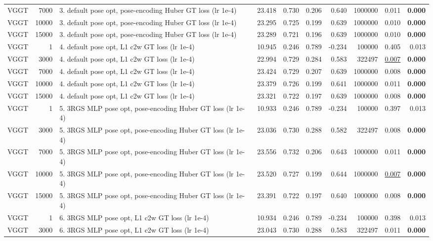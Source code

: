 \begin{table}[H]
\begin{tabular}{lrlrrrrrrr}
VGGT & 7000 & 3. default pose opt, pose-encoding Huber GT loss (lr 1e-4) & 23.418 & 0.730 & 0.206 & 0.640 & 1000000 & 0.011 & \textbf{0.000} \\
VGGT & 10000 & 3. default pose opt, pose-encoding Huber GT loss (lr 1e-4) & 23.295 & 0.725 & 0.199 & 0.639 & 1000000 & 0.010 & \textbf{0.000} \\
VGGT & 15000 & 3. default pose opt, pose-encoding Huber GT loss (lr 1e-4) & 23.289 & 0.721 & 0.196 & 0.639 & 1000000 & 0.010 & \textbf{0.000} \\
VGGT & 1 & 4. default pose opt, L1 c2w GT loss (lr 1e-4) & 10.945 & 0.246 & 0.789 & -0.234 & 100000 & 0.405 & 0.013 \\
VGGT & 3000 & 4. default pose opt, L1 c2w GT loss (lr 1e-4) & 22.994 & 0.729 & 0.284 & 0.583 & 322497 & \underline{0.007} & \textbf{0.000} \\
VGGT & 7000 & 4. default pose opt, L1 c2w GT loss (lr 1e-4) & 23.424 & 0.729 & 0.207 & 0.639 & 1000000 & 0.008 & \textbf{0.000} \\
VGGT & 10000 & 4. default pose opt, L1 c2w GT loss (lr 1e-4) & 23.379 & 0.726 & 0.199 & 0.641 & 1000000 & 0.011 & \textbf{0.000} \\
VGGT & 15000 & 4. default pose opt, L1 c2w GT loss (lr 1e-4) & 23.321 & 0.722 & 0.197 & 0.639 & 1000000 & 0.008 & \textbf{0.000} \\
VGGT & 1 & 5. 3RGS MLP pose opt, pose-encoding Huber GT loss (lr 1e-4) & 10.933 & 0.246 & 0.789 & -0.234 & 100000 & 0.397 & 0.013 \\
VGGT & 3000 & 5. 3RGS MLP pose opt, pose-encoding Huber GT loss (lr 1e-4) & 23.036 & 0.730 & 0.288 & 0.582 & 322497 & 0.008 & \textbf{0.000} \\
VGGT & 7000 & 5. 3RGS MLP pose opt, pose-encoding Huber GT loss (lr 1e-4) & 23.556 & 0.732 & 0.206 & 0.643 & 1000000 & 0.011 & \textbf{0.000} \\
VGGT & 10000 & 5. 3RGS MLP pose opt, pose-encoding Huber GT loss (lr 1e-4) & 23.520 & 0.727 & 0.199 & 0.644 & 1000000 & \underline{0.007} & \textbf{0.000} \\
VGGT & 15000 & 5. 3RGS MLP pose opt, pose-encoding Huber GT loss (lr 1e-4) & 23.391 & 0.722 & 0.197 & 0.640 & 1000000 & 0.008 & \textbf{0.000} \\
VGGT & 1 & 6. 3RGS MLP pose opt, L1 c2w GT loss (lr 1e-4) & 10.934 & 0.246 & 0.789 & -0.234 & 100000 & 0.398 & 0.013 \\
VGGT & 3000 & 6. 3RGS MLP pose opt, L1 c2w GT loss (lr 1e-4) & 23.043 & 0.730 & 0.288 & 0.583 & 322497 & 0.011 & \textbf{0.000} \\

\end{tabular}
\end{table}
